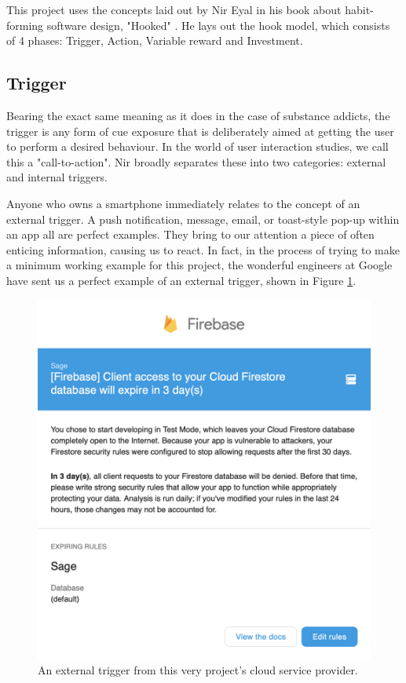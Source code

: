 This project uses the concepts laid out by Nir Eyal in his book about habit-forming software design, "Hooked" \cite{eyal2014hooked}. He lays out the hook model, which consists of 4 phases: Trigger, Action, Variable reward and Investment.

\subsection{Trigger}
Bearing the exact same meaning as it does in the case of substance addicts, the trigger is any form of cue exposure that is deliberately aimed at getting the user to perform a desired behaviour. In the world of user interaction studies, we call this a "call-to-action".  Nir broadly separates these into two categories: external and internal triggers.

Anyone who owns a smartphone immediately relates to the concept of an external trigger. A push notification, message, email, or toast-style pop-up within an app all are perfect examples. They bring to our attention a piece of often enticing information, causing us to react. In fact, in the process of trying to make a minimum working example for this project, the wonderful engineers at Google have sent us a perfect example of an external trigger, shown in Figure \ref{fig:firebase_cue}.

\begin{figure}[h]
    \begin{center}
        \includegraphics[scale=0.3]{images/firebase_cue.png}
    \end{center}
    \caption{An external trigger from this very project's cloud service provider.}
    \label{fig:firebase_cue}
\end{figure}

